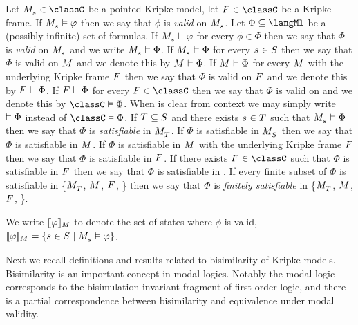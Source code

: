 Let $\kPModel{\kStateS} \in \classC$ be a pointed Kripke model,
let $\kFrame \in \classC$ be a Kripke frame.
If $\kPModel{\kStateS} \entails \phi$ then we say that $\phi$ is {\em valid} on $\kPModel{\kStateS}$.
Let $\Phi \subseteq \langMl$ be a (possibly infinite) set of formulas.
If $\kPModel{\kStateS} \entails \phi$ for every $\phi \in \Phi$ then we say that $\Phi$ is {\em valid} on $\kPModel{\kStateS}$ and we write $\kPModel{\kStateS} \entails \Phi$.
If $\kPModel{\kStateS} \entails \Phi$ for every $\kStateS \in \kStates$ then we say that $\Phi$ is valid on $\kModel$ and we denote this by $\kModel \entails \Phi$.
If $\kModel \entails \Phi$ for every $\kModel$ with the underlying Kripke frame $\kFrame$ then we say that $\Phi$ is valid on $\kFrame$ and we denote this by $\kFrame \entails \Phi$.
If $\kFrame \entails \Phi$ for every $\kFrame \in \classC$ then we say that $\Phi$ is valid on \classC{} and we denote this by $\classC \entails \Phi$.
When \classC{} is clear from context we may simply write $\vDash \Phi$ instead of $\classC \entails \Phi$.
If $\kStatesT \subseteq \kStates$ and there exists $\kStateS \in \kStatesT$ such that $\kPModel{\kStateS} \entails \Phi$ then we say that $\Phi$ is {\em satisfiable} in $\kPModel{\kStatesT}$.
If $\Phi$ is satisfiable in $\kPModel{\kStates}$ then we say that $\Phi$ is satisfiable in $\kModel$.
If $\Phi$ is satisfiable in $\kModel$ with the underlying Kripke frame $\kFrame$ then we say that $\Phi$ is satisfiable in $\kFrame$.
If there exists $\kFrame \in \classC$ such that $\Phi$ is satisfiable in $\kFrame$ then we say that $\Phi$ is satisfiable in \classC{}.
If every finite subset of $\Phi$ is satisfiable in \{$\kPModel{\kStatesT}$, $\kModel$, $\kFrame$, \classC{}\} then we say that $\Phi$ is {\em finitely satisfiable} in \{$\kPModel{\kStatesT}$, $\kModel$, $\kFrame$, \classC{}\}.

We write $\interpretation[\kModel]{\phi}$ to denote the set of states where $\phi$ is valid, $\interpretation[\kModel]{\phi} = \{\kStateS \in \kStates \mid \kPModel{\kStateS} \entails \phi\}$.

Next we recall definitions and results related to bisimilarity of Kripke models.
Bisimilarity is an important concept in modal logics.
Notably the modal logic \logicK{} corresponds to the bisimulation-invariant fragment of first-order logic, and there is a partial correspondence between bisimilarity and equivalence under modal validity.

